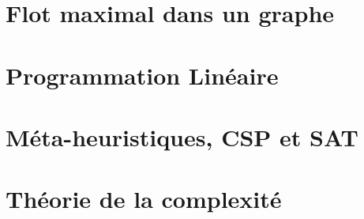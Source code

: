 





% 

\chapter{Flot maximal dans un graphe}


\chapter{Programmation Linéaire}


\chapter{Méta-heuristiques, CSP et SAT}


\chapter{Théorie de la complexité}
